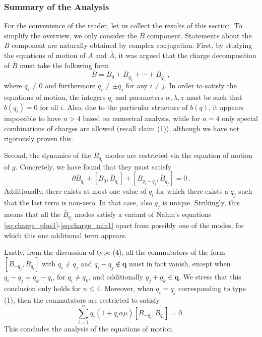 \documentclass[11pt,a4paper]{article}
\numberwithin{equation}{section}
\numberwithin{table}{section}\setlength{\multlinegap}{25pt}
\begin{document}
\subsubsection*{Summary of the Analysis}

For the convenience of the reader, let us collect the results of this section. To simplify the overview, we only consider the $\bar{B}$ component. Statements about the $B$ component are naturally obtained by complex conjugation. First, by studying the equations of motion of $A$ and $\bar{A}$, it was argued that the charge decomposition of $\bar{B}$ must take the following form
\begin{equation}\label{eq:sol_barB}
	\bar{B} = \bar{B}_0+\bar{B}_{q_1}+\cdots+\bar{B}_{q_n}\,,
\end{equation}
where $q_i\neq 0$ and furthermore $q_i\neq\pm q_j$ for any $i\neq j$. In order to satisfy the equations of motion, the integers $q_i$ and parameters $\alpha,\lambda,z$ must be such that $b(q_i)=0$ for all $i$. Also, due to the particular structure of $b(q)$, it appears impossible to have $n>4$ based on numerical analysis, while for $n=4$ only special combinations of charges are allowed (recall claim (1)), although we have not rigorously proven this. 

Second, the dynamics of the $\bar{B}_{q_i}$ modes are restricted via the equation of motion of $g$. Concretely, we have found that they must satisfy
\begin{equation}\label{eq:dynamics_B}
	\partial\bar{B}_{q_i}+[B_0,\bar{B}_{q_i}]+[B_{q_i-q_j},\bar{B}_{q_j}]=0\,.
\end{equation}
Additionally, there exists at most one value of $q_i$ for which there exists a $q_j$ such that the last term is non-zero. In that case, also $q_j$ is unique. Strikingly, this means that all the $\bar{B}_{q_i}$ modes satisfy a variant of Nahm's equations \eqref{eq:charge_plus1}-\eqref{eq:charge_min1} apart from possibly one of the modes, for which this one additional term appears. 

Lastly, from the discussion of type (4), all the commutators of the form $[B_{-q_j},\bar{B}_{q_i}]$ with $q_i\neq q_j$ and $q_i-q_j\not\in\mathbf{q}$ must in fact vanish, except when $q_i-q_j=q_k-q_l$, for $q_i\neq q_k$, and additionally $q_j+q_k\in\mathbf{q}$. We stress that this conclusion only holds for $n\leq 4$. Moreover, when $q_i=q_j$ corresponding to type (1), then the commutators are restricted to satisfy
\begin{equation}\label{eq:constraint_commutator}
	\sum_{i=1}^n q_i(1+q_i\alpha\mu)[B_{-q_i},\bar{B}_{q_i}]=0\,.
\end{equation}
This concludes the analysis of the equations of motion. 
\end{document}
